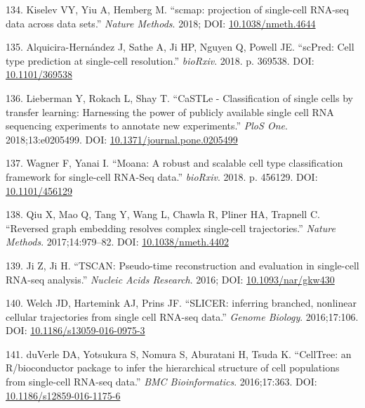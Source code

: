 \documentclass[11pt,a4paper,titlepage,twoside,openright]{style/unimelbthesis}
\theoremstyle{definition}
\theoremstyle{definition}
\theoremstyle{definition}
\theoremstyle{remark}
\begin{document}
\begin{mainmatter}
\leavevmode\hypertarget{ref-Kiselev2018-nu}{}%
134. Kiselev VY, Yiu A, Hemberg M. ``scmap: projection of single-cell RNA-seq data across data sets.'' \emph{Nature Methods}. 2018; DOI: \href{https://doi.org/10.1038/nmeth.4644}{10.1038/nmeth.4644}

\leavevmode\hypertarget{ref-Alquicira-Hernandez2018-qx}{}%
135. Alquicira-Hernández J, Sathe A, Ji HP, Nguyen Q, Powell JE. ``scPred: Cell type prediction at single-cell resolution.'' \emph{bioRxiv}. 2018. p. 369538. DOI: \href{https://doi.org/10.1101/369538}{10.1101/369538}

\leavevmode\hypertarget{ref-Lieberman2018-zg}{}%
136. Lieberman Y, Rokach L, Shay T. ``CaSTLe - Classification of single cells by transfer learning: Harnessing the power of publicly available single cell RNA sequencing experiments to annotate new experiments.'' \emph{PloS One}. 2018;13:e0205499. DOI: \href{https://doi.org/10.1371/journal.pone.0205499}{10.1371/journal.pone.0205499}

\leavevmode\hypertarget{ref-Wagner2018-xl}{}%
137. Wagner F, Yanai I. ``Moana: A robust and scalable cell type classification framework for single-cell RNA-Seq data.'' \emph{bioRxiv}. 2018. p. 456129. DOI: \href{https://doi.org/10.1101/456129}{10.1101/456129}

\leavevmode\hypertarget{ref-Qiu2017-mq}{}%
138. Qiu X, Mao Q, Tang Y, Wang L, Chawla R, Pliner HA, Trapnell C. ``Reversed graph embedding resolves complex single-cell trajectories.'' \emph{Nature Methods}. 2017;14:979--82. DOI: \href{https://doi.org/10.1038/nmeth.4402}{10.1038/nmeth.4402}

\leavevmode\hypertarget{ref-Ji2016-ws}{}%
139. Ji Z, Ji H. ``TSCAN: Pseudo-time reconstruction and evaluation in single-cell RNA-seq analysis.'' \emph{Nucleic Acids Research}. 2016; DOI: \href{https://doi.org/10.1093/nar/gkw430}{10.1093/nar/gkw430}

\leavevmode\hypertarget{ref-Welch2016-cw}{}%
140. Welch JD, Hartemink AJ, Prins JF. ``SLICER: inferring branched, nonlinear cellular trajectories from single cell RNA-seq data.'' \emph{Genome Biology}. 2016;17:106. DOI: \href{https://doi.org/10.1186/s13059-016-0975-3}{10.1186/s13059-016-0975-3}

\leavevmode\hypertarget{ref-DuVerle2016-ni}{}%
141. duVerle DA, Yotsukura S, Nomura S, Aburatani H, Tsuda K. ``CellTree: an R/bioconductor package to infer the hierarchical structure of cell populations from single-cell RNA-seq data.'' \emph{BMC Bioinformatics}. 2016;17:363. DOI: \href{https://doi.org/10.1186/s12859-016-1175-6}{10.1186/s12859-016-1175-6}


\end{mainmatter}
\end{document}
